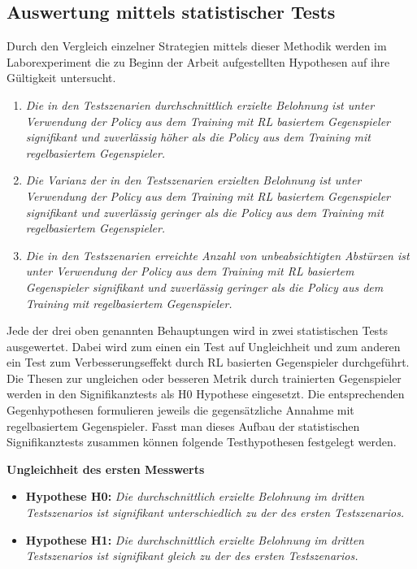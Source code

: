 \subsection{Auswertung mittels statistischer Tests}

Durch den Vergleich einzelner Strategien mittels dieser Methodik werden im Laborexperiment die zu Beginn der Arbeit aufgestellten Hypothesen auf ihre Gültigkeit untersucht.
\begin{enumerate}
    \item \textit{Die in den Testszenarien durchschnittlich erzielte Belohnung ist unter Verwendung der Policy aus dem Training mit RL basiertem Gegenspieler signifikant und zuverlässig höher als die Policy aus dem Training mit regelbasiertem Gegenspieler.}
    \item \textit{Die Varianz der in den Testszenarien erzielten Belohnung ist unter Verwendung der Policy aus dem Training mit RL basiertem Gegenspieler signifikant und zuverlässig geringer als die Policy aus dem Training mit regelbasiertem Gegenspieler.}
    \item \textit{Die in den Testszenarien erreichte Anzahl von unbeabsichtigten Abstürzen ist unter Verwendung der Policy aus dem Training mit RL basiertem Gegenspieler signifikant und zuverlässig geringer als die Policy aus dem Training mit regelbasiertem Gegenspieler.}
\end{enumerate}

Jede der drei oben genannten Behauptungen wird in zwei statistischen Tests ausgewertet.
Dabei wird zum einen ein Test auf Ungleichheit und zum anderen ein Test zum Verbesserungseffekt durch RL basierten Gegenspieler durchgeführt.
Die Thesen zur ungleichen oder besseren Metrik durch trainierten Gegenspieler werden in den Signifikanztests als H0 Hypothese eingesetzt.
Die entsprechenden Gegenhypothesen formulieren jeweils die gegensätzliche Annahme mit regelbasiertem Gegenspieler. 
Fasst man dieses Aufbau der statistischen Signifikanztests zusammen können folgende Testhypothesen festgelegt werden. 

\textbf{Ungleichheit des ersten Messwerts}
\begin{itemize}
    \item \textbf{Hypothese H0:} \textit{Die durchschnittlich erzielte Belohnung im dritten Testszenarios ist signifikant unterschiedlich zu der des ersten Testszenarios.}
    \item \textbf{Hypothese H1:} \textit{Die durchschnittlich erzielte Belohnung im dritten Testszenarios ist signifikant gleich zu der des ersten Testszenarios.}
\end{itemize}


